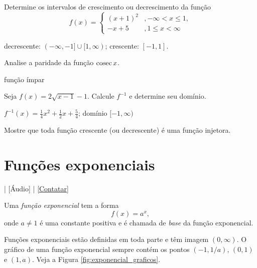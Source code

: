 \begin{exer}
  Determine os intervalos de crescimento ou decrescimento da função
  \begin{equation}
    f(x) = \left\{
      \begin{array}{ll}
        (x+1)^2 &, -\infty < x \leq 1,\\
        -x+5 &, 1 \leq x < \infty
      \end{array}
\right.
  \end{equation}
\end{exer}
\begin{resp}
  decrescente: $(-\infty, -1]\cup [1, \infty)$; crescente: $[-1, 1]$.
\end{resp}

\begin{exer}
  Analise a paridade da função $\operatorname{cosec} x$.
\end{exer}
\begin{resp}
  função ímpar
\end{resp}

\begin{exer}
  Seja $f(x) = 2\sqrt{x-1}-1$. Calcule $f^{-1}$ e determine seu domínio.
\end{exer}
\begin{resp}
  $f^{-1}(x) = \frac{1}{4}x^2 + \frac{1}{2}x + \frac{5}{4}$; domínio $[-1, \infty)$
\end{resp}

\begin{exer}
  Mostre que toda função crescente (ou decrescente) é uma função injetora.
\end{exer}

\section{Funções exponenciais}\label{cap_funcao_sec_funexp}

\begin{flushright}
  [Vídeo] | [Áudio] | \href{https://phkonzen.github.io/notas/contato.html}{[Contatar]}
\end{flushright}

Uma \emph{função exponencial} tem a forma
\begin{equation}
  f(x) = a^x,
\end{equation}
onde $a\neq 1$ é uma constante positiva e é chamada de \emph{base} da função exponencial.

Funções exponenciais estão definidas em toda parte e têm imagem $(0, \infty)$. O gráfico de uma função exponencial sempre contém os pontos $(-1,1/a)$, $(0,1)$ e $(1,a)$. Veja a Figura \ref{fig:exponencial_graficos}.

